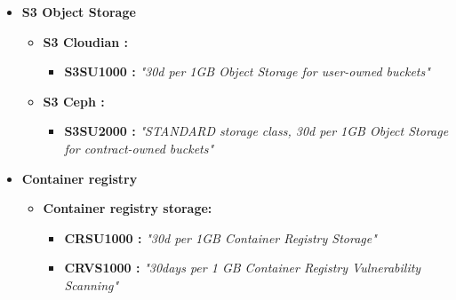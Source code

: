 \begin{itemize}
\begin{itemize}
\begin{itemize}
                    \end{itemize}
              \item \textbf{PostreSQL } \begin{itemize}
                        \item \textbf{DBPGC1000 : } \textit{"1h core for PostgreSQL DBaaS"}
                        \item \textbf{DBPGR1000 : } \textit{"1h per GB RAM for PostgreSQL DBaaS"}
                        \item \textbf{DBPGS1000 : } \textit{"30d per GB HDD Storage for PostgreSQL DBaaS}
                        \item \textbf{DBPGS2000 : } \textit{"30d per GB SSD Standard Storage for PostgreSQL DBaaS"}
                        \item \textbf{DBPGS3000 : } \textit{"30d per GB SSD Premium Storage for PostgreSQL DBaaS"}
                    \end{itemize}
          \end{itemize}
    \item \textbf{S3 Object Storage} \begin{itemize}
              \item \textbf{S3 Cloudian :} \begin{itemize}
                        \item \textbf{S3SU1000 : } \textit{"30d per 1GB Object Storage for user-owned buckets"}
                    \end{itemize}
              \item \textbf{S3 Ceph :} \begin{itemize}
                        \item \textbf{S3SU2000 : } \textit{"STANDARD storage class, 30d per 1GB Object Storage for contract-owned buckets"}
                    \end{itemize}
          \end{itemize}
    \item \textbf{Container registry} \begin{itemize}
              \item \textbf{Container registry storage:} \begin{itemize}
                        \item \textbf{CRSU1000 : } \textit{"30d per 1GB Container Registry Storage"}
                        \item \textbf{CRVS1000 : } \textit{"30days per 1 GB Container Registry Vulnerability Scanning"}
                    \end{itemize}
          \end{itemize}

\end{itemize}